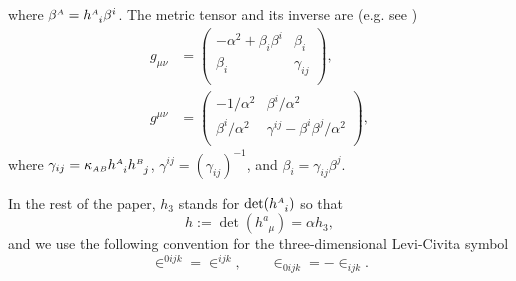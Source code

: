 \documentclass[
10pt, %
a4paper, %
oneside, %
twocolumn,
headinclude,footinclude, %
BCOR5mm, %
]{scrartcl}
\newcommand{\sA}{\mathsmaller A}
\newcommand{\sB}{\mathsmaller B}
\newcommand{\tetrsymbol}{h}
\newcommand{\tetr}[2]{\tetrsymbol^{#1}_{\phantom{#1}#2}}
\newcommand{\detTetr}{\tetrsymbol}
\newcommand{\ET}[2]{E^{#1}_{\phantom{#1}#2}}	%
\newcommand{\Dm}[2]{D_{\phantom{#2}#1}^{#2}}	%
\newcommand{\BT}[2]{B^{#1#2}}	%
\newcommand{\Bm}[2]{B^{#1#2}}	%
\newcommand{\hT}[2]{H_{#1#2}}	%
\newcommand{\LagBE}{\mathcal{L}}%
\newcommand{\Um}{U}%
\newcommand{\LCsymb}{\bm{\in}}    %
\begin{document}
	where $ \beta^{\sA} = \tetr{\sA}{i}\beta^i$.
	The metric tensor and its inverse are (e.g. see \cite{Gourgoulhon2012a})
	\begin{subequations}
		\begin{align}
			g_{\mu\nu} &= \left(
			\begin{array}{cc}
				-\alpha^2 + \beta_i\beta^i & \beta_i \\[1mm]
				\beta_i & \gamma_{ij}  \\
			\end{array}
			\right) ,
			\\[2mm]
			g^{\mu\nu} &= \left(
			\begin{array}{cc}
				-1/\alpha^2       & \beta^i/\alpha^2 \\[1mm]
				\beta^{i}/\alpha^2 & \gamma^{ij} - \beta^i\beta^j/\alpha^2  \\
			\end{array}
			\right) ,
		\end{align}
	\end{subequations}
	where $ \gamma_{ij} = \kappa_{\sA\sB} \tetr{\sA}{i}\tetr{\sB}{j}$, $ 
	\gamma^{ij} = \left( \gamma_{ij} \right)^{-1}  $, and $ \beta_i =  \gamma_{ij}\beta^j$.
	
	In the rest of the paper, $ \detTetr_3 $ stands for $ \det(\tetr{\sA}{i}) $ so that
	\begin{equation}\label{eqn.det}
		\detTetr := \det(\tetr{a}{\mu}) = \alpha \detTetr_3,
	\end{equation}
	and we use the following convention for the three-dimensional Levi-Civita symbol
	\begin{equation}\label{eqn.LC.3d}
		\LCsymb^{0ijk} = \LCsymb^{ijk}, 
		\qquad
		\LCsymb_{0ijk} =-\LCsymb_{ijk}.
	\end{equation}
	
	
	
\end{document}
